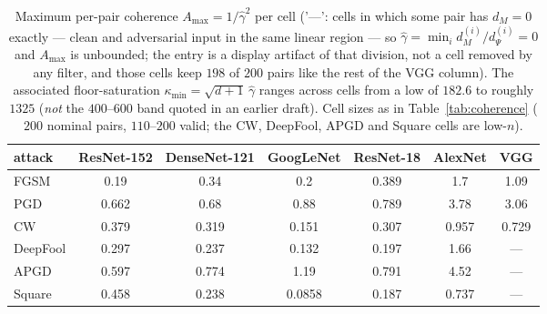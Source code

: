 \begin{table}[t]
\centering\small
\begin{tabular}{lcccccc}
\toprule
attack & ResNet-152 & DenseNet-121 & GoogLeNet & ResNet-18 & AlexNet & VGG \\
\midrule
FGSM & 0.19 & 0.34 & 0.2 & 0.389 & 1.7 & 1.09 \\
PGD & 0.662 & 0.68 & 0.88 & 0.789 & 3.78 & 3.06 \\
CW & 0.379 & 0.319 & 0.151 & 0.307 & 0.957 & 0.729 \\
DeepFool & 0.297 & 0.237 & 0.132 & 0.197 & 1.66 & --- \\
APGD & 0.597 & 0.774 & 1.19 & 0.791 & 4.52 & --- \\
Square & 0.458 & 0.238 & 0.0858 & 0.187 & 0.737 & --- \\
\bottomrule
\end{tabular}
\caption{Maximum per-pair coherence $A_{\max}=1/\widehat\gamma^2$ per cell ('---': cells in which some pair
has $d_M=0$ exactly --- clean and adversarial input in the same linear region --- so $\widehat\gamma=\min_i
d_M^{(i)}/d_\Psi^{(i)}=0$ and $A_{\max}$ is unbounded; the entry is a display artifact of that division, not a
cell removed by any filter, and those cells keep $198$ of $200$ pairs like the rest of the VGG column). The associated
floor-saturation $\kappa_{\min}=\sqrt{d{+}1}\,\widehat\gamma$ ranges across cells from a low of $182.6$
to roughly $1325$ (\emph{not} the $400$--$600$ band quoted in an earlier draft). Cell sizes as in
Table~\ref{tab:coherence} ($200$ nominal pairs, $110$--$200$ valid; the CW, DeepFool, APGD and Square cells are low-$n$).}
\label{tab:coherence-max}
\end{table}
